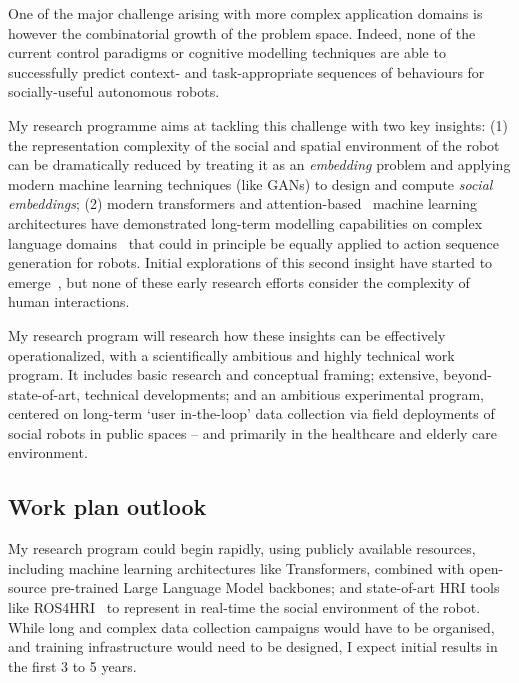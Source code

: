 One of the major challenge arising with more complex application domains is
however the combinatorial growth of the problem space. Indeed, none of the
current control paradigms or cognitive modelling techniques are able to
successfully predict context- and task-appropriate sequences of behaviours
for socially-useful autonomous robots.

\vspace{0.4em}

My research programme aims at tackling this challenge with two key insights: (1) the
representation complexity of the social and spatial environment of the robot 
can be dramatically reduced by treating it as an \emph{embedding} problem and
applying modern machine learning techniques (like GANs) to design and compute
\emph{social embeddings}; (2)
modern transformers and attention-based~\autocite{vaswani2017attention} machine learning
architectures have demonstrated long-term modelling
capabilities on complex language domains~\autocite{ouyang2022training} that could
in principle be equally applied to action sequence generation for
robots. Initial explorations of this second insight have started to
emerge~\autocite{brohan2022rt,vemprala2023chatgpt}, but none of these early research
efforts consider the complexity of human interactions.

\vspace{0.4em}

My research program will research how these insights can be effectively
operationalized, with a scientifically ambitious
and highly technical work program. It includes basic research and conceptual
framing; extensive, beyond-state-of-art, technical developments; and an
ambitious experimental program, centered on long-term `user in-the-loop' data
collection via field deployments of social
robots in public spaces -- and primarily in the healthcare and elderly care
environment.


\subsection{Work plan outlook}

My research program could begin rapidly, using publicly available resources,
including machine learning architectures like Transformers, combined with open-source
pre-trained Large Language Model backbones; and state-of-art HRI tools like
ROS4HRI~\autocite{mohamed2021ros4hri} to represent in real-time the social
environment of the robot. While long and complex data collection campaigns would
have to be organised, and training infrastructure would need to
be designed, I expect initial results in the first 3 to 5 years.


